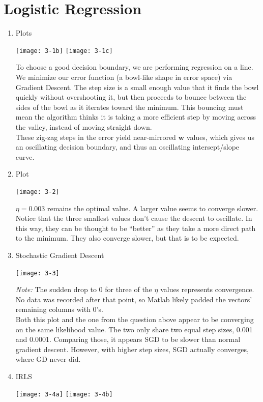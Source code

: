 \documentclass{article}
\begin{document}
\section{Logistic Regression}

\begin{enumerate}
\item Plots
  \begin{center}
  \texttt{[image: 3-1b]}
  \texttt{[image: 3-1c]}
\end{center}

  To choose a good decision boundary, we are performing regression on a line.
  We minimize our error function (a bowl-like shape in error space) via
  Gradient Descent. The step size is a small enough value that it finds the
  bowl quickly without overshooting it, but then proceeds to bounce between
  the sides of the bowl as it iterates toward the minimum. This bouncing
  must mean the algorithm thinks it is taking a more efficient step
  by moving across the valley, instead of moving straight down.\\

  These zig-zag steps in the error yield near-mirrored $\mathbf{w}$ values,
  which gives us an oscillating decision boundary, and thus an
  oscillating intersept/slope curve.
  
\item Plot
  \begin{center}
    \texttt{[image: 3-2]}
  \end{center}

  $\eta = 0.003$ remains the optimal value. A larger value seems to
  converge slower.\\
  Notice that the three smallest values don't cause the descent to oscillate.
  In this way, they can be thought to be ``better'' as they take a more
  direct path to the minimum.
  They also converge slower, but that is to be expected.

\item Stochastic Gradient Descent
  \begin{center}
    \texttt{[image: 3-3]}
  \end{center}

  \emph{Note:} The sudden drop to 0 for three of the $\eta$ values
  represents convergence. No data was recorded after that point, so
  Matlab likely padded the vectors' remaining columns with 0's.\\
  
  Both this plot and the one from the question above appear to be
  converging on the same likelihood value. The two only share two equal
  step sizes, 0.001 and 0.0001. Comparing those, it appears SGD to be
  slower than normal gradient descent. However, with higher step sizes,
  SGD actually converges, where GD never did.

\item IRLS
  \begin{center}
  \texttt{[image: 3-4a]}
  \texttt{[image: 3-4b]}
\end{center}
\end{enumerate}
\end{document}
